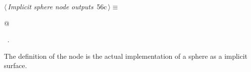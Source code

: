 \documentclass[
    a4paper,      %
    10pt,         %
    openright,    %
    notitlepage,  %
    parskip=half, %
]{scrreprt}       %
\theoremstyle{definition}                    %
\begin{document}
\begin{flushleft} \small
\begin{minipage}{\linewidth}\label{scrap92}\raggedright\small
{} $\langle\,${\itshape Implicit sphere node outputs}\nobreak\ {\footnotesize {56c}}$\,\rangle\equiv$
\vspace{-1ex}
\begin{list}{}{} \item
\mbox{}@{\NWsep}
\end{list}
\vspace{-1.5ex}
\footnotesize
\begin{list}{}{\setlength{\itemsep}{-\parsep}\setlength{\itemindent}{-\leftmargin}}
\item \NWtxtMacroRefIn\ .

\item{}
\end{list}
\end{minipage}\vspace{4ex}
\end{flushleft}
The definition of the node is the actual implementation of a sphere as a
implicit surface.
\end{document}
